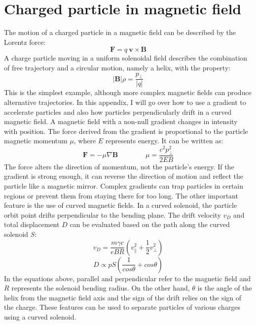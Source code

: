 \chapter{Charged particle in magnetic field}\label{appendix1}
The motion of a charged particle in a magnetic field can be described by the Lorentz force:
\begin{equation}
    \mathbf{F}=q \ \mathbf{v}\times\mathbf{B}
\end{equation}
A charge particle moving in a uniform solenoidal field describes the combination of free trajectory and a circular motion, namely a helix, with the property:
\begin{equation}\label{partincamp}
    |\mathbf{B}|\rho=\frac{p_\perp}{|q|}
\end{equation}
This is the simplest example, although more complex magnetic fields can produce alternative trajectories. In this appendix, I will go over how to use a gradient to accelerate particles and also how particles perpendicularly drift in a curved magnetic field. A magnetic field with a non-null gradient changes in intensity with position. The force derived from the gradient is proportional to the particle magnetic momentum $\mu$, where $E$ represents energy. It can be written as:
\begin{equation}
   \mathbf{F}=-\mu \nabla \mathbf{B} \qquad \qquad \mu=\frac{c^2 p_\perp^2}{2 E B}
\end{equation}
The force alters the direction of momentum, not the particle's energy. If the gradient is strong enough, it can reverse the direction of motion and reflect the particle like a magnetic mirror. Complex gradients can trap particles in certain regions or prevent them from staying there for too long.
The other important feature is the use of curved magnetic fields. In a curved solenoid, the particle orbit point drifts perpendicular to the bending plane. The drift velocity $v_D$ and total displacement $D$ can be evaluated based on the path along the curved solenoid $S$:
\begin{equation}
    v_D=\frac{m \gamma c}{e B R}(v_\parallel ^2+\frac{1}{2}v_\perp ^2)
\end{equation}
\begin{equation}
    D \propto p S (\frac{1}{cos \theta} + cos \theta)
\end{equation}
In the equations above, parallel and perpendicular refer to the magnetic field and $R$ represents the solenoid bending radius. On the other hand, $\theta$ is the angle of the helix from the magnetic field axis and the sign of the drift relies on the sign of the charge. These features can be used to separate particles of various charges using a curved solenoid.
